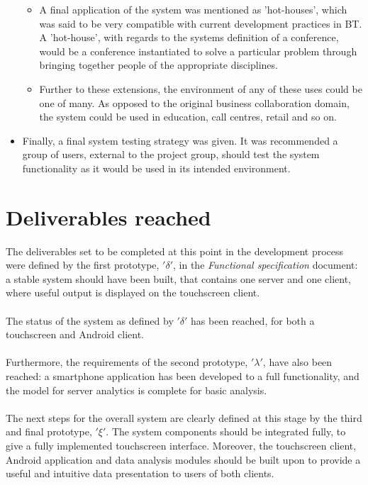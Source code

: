 \documentclass[12p, a4paper, onecolumn]{report}
\begin{document}
\begin{itemize}
\begin{itemize}
\item A final application of the system was mentioned as 'hot-houses', which was said to be very compatible with current development practices in BT. A 'hot-house', with regards to the systems definition of a conference, would be a conference instantiated to solve a particular problem through bringing together people of the appropriate disciplines.
\item Further to these extensions, the environment of any of these uses could be one of many. As opposed to the original business collaboration domain, the system could be used in education, call centres, retail and so on.
\end{itemize}
\item Finally, a final system testing strategy was given. It was recommended a group of users, external to the project group, should test the system functionality as it would be used in its intended environment.
\end{itemize}

\section{Deliverables reached}

The deliverables set to be completed at this point in the development process were defined by the first prototype, $'\delta'$, in the \emph{Functional specification} document: a stable system should have been built, that contains one server and one client, where useful output is displayed on the touchscreen client. \\ \\
The status of the system as defined by $'\delta'$ has been reached, for both a touchscreen and Android client. \\ \\
Furthermore, the requirements of the second prototype, $'\lambda'$, have also been reached: a smartphone application has been developed to a full functionality, and the model for server analytics is complete for basic analysis. \\ \\
The next steps for the overall system are clearly defined at this stage by the third and final prototype, $'\xi'$. The system components should be integrated fully, to give a fully implemented touchscreen interface. Moreover, the touchscreen client, Android application and data analysis modules should be built upon to provide a useful and intuitive data presentation to users of both clients.
\end{document}
